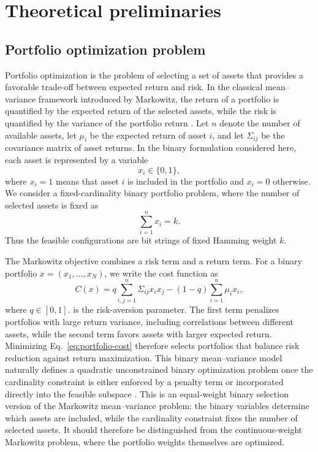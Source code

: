 \section{\label{sec:preliminaries}Theoretical preliminaries}

\subsection{Portfolio optimization problem}

Portfolio optimization is the problem of selecting a set of assets that provides a favorable trade-off between expected return and risk. In the classical mean--variance framework introduced by Markowitz, the return of a portfolio is quantified by the expected return of the selected assets, while the risk is quantified by the variance of the portfolio return \cite{Markowitz1952,Markowitz1959}. Let \(n\) denote the number of available assets, let \(\mu_i\) be the expected
return of asset \(i\), and let \(\Sigma_{ij}\) be the covariance matrix of asset
returns. In the binary formulation considered here, each asset is represented
by a variable
\begin{equation}
    x_i \in \{0,1\},
\end{equation}
where \(x_i=1\) means that asset \(i\) is included in the portfolio and
\(x_i=0\) otherwise. We consider a fixed-cardinality binary portfolio problem,
where the number of selected assets is fixed as
\begin{equation}
    \sum_{i=1}^{n} x_i = k .
\end{equation}
Thus the feasible configurations are bit strings of fixed Hamming weight \(k\).

The Markowitz objective combines a risk term and a return term. For a binary portfolio \(x=(x_1,\ldots,x_N)\), we write the cost function as
\begin{equation}
    C(x)
    =
    q \sum_{i,j=1}^{n} \Sigma_{ij} x_i x_j
    -
    (1-q)\sum_{i=1}^{n} \mu_i x_i ,
    \label{eq:portfolio-cost}
\end{equation}
where \(q\in[0,1]\). is the risk-aversion parameter. The first term penalizes portfolios with large return variance, including correlations between different assets, while the second term favors assets with larger expected return. Minimizing Eq.~\eqref{eq:portfolio-cost} therefore selects portfolios that balance risk reduction against return maximization. This binary mean--variance model naturally defines a quadratic unconstrained binary optimization problem once the cardinality constraint is either enforced by a penalty term or incorporated directly into the feasible subspace \cite{Lucas2014,Venturelli2019}. This is an equal-weight binary selection version of the Markowitz
mean--variance problem: the binary variables determine which assets are
included, while the cardinality constraint fixes the number of selected assets.
It should therefore be distinguished from the continuous-weight Markowitz
problem, where the portfolio weights themselves are optimized.


